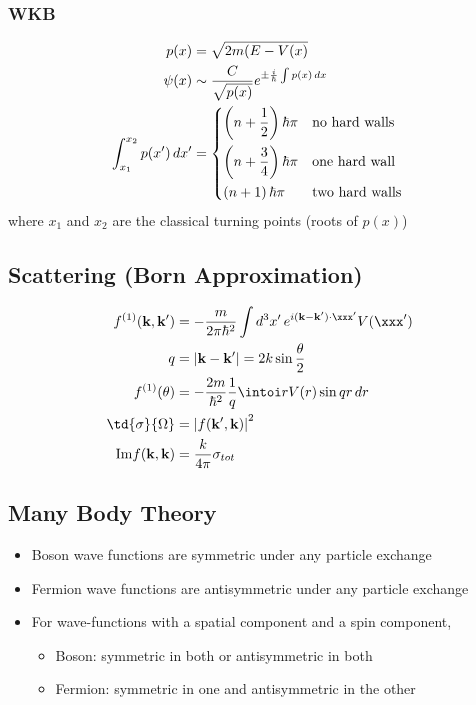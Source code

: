 \documentclass[11pt]{article}
\begin{document}
\subsubsection{WKB}
\label{sec:orga5b9160}
\begin{align*}
p(x) & = \sqrt{2m(E - V(x)} \\
\psi(x) & \sim \frac{C}{\sqrt{p(x)}} e^{\pm \frac{i}{\hbar} \int p(x) \, dx} \\
\int_{x_1}^{x_2} p(x') \, dx' & = \begin{dcases*}
                                        \left( n + \frac{1}{2} \right) \hbar \pi & no hard walls \\
                                        \left( n + \frac{3}{4} \right) \hbar \pi & one hard wall \\
                                        \left( n + 1 \right)           \hbar \pi & two hard walls \\
                                  \end{dcases*}
\end{align*}
where \(x_1\) and \(x_2\) are the classical turning points (roots of \(p(x)\))

\subsection{Scattering (Born Approximation)}
\label{sec:org3929da2}
\begin{align*}
f^{(1)}(\mathbf{k}, \mathbf{k}') & = -\frac{m}{2\pi \hbar^2} \int d^3 x' \, e^{i(\mathbf{k} - \mathbf{k}') \cdot \xxx'} V(\xxx') \\
q & = \left| \mathbf{k} - \mathbf{k}' \right| = 2k \sin \frac{\theta}{2} \\
f^{(1)}(\theta) & = -\frac{2m}{\hbar^2} \frac{1}{q} \intoi r V(r) \sin qr \, dr \\
\td{\sigma}{\Omega} & = \left| f(\mathbf{k}', \mathbf{k}) \right|^2 \\
\mathrm{Im} f(\mathbf{k}, \mathbf{k}) & = \frac{k}{4\pi} \sigma_{tot}
\end{align*}

\subsection{Many Body Theory}
\label{sec:org415da15}
\begin{itemize}
\item Boson wave functions are symmetric under any particle exchange
\item Fermion wave functions are antisymmetric under any particle exchange
\item For wave-functions with a spatial component and a spin component,
\begin{itemize}
\item Boson: symmetric in both or antisymmetric in both
\item Fermion: symmetric in one and antisymmetric in the other
\end{itemize}
\end{itemize}
\end{document}

